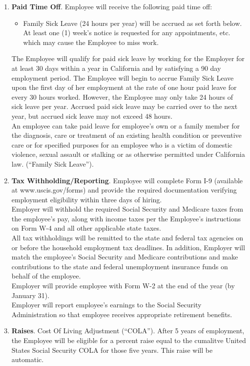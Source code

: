\documentclass[]{article}
\begin{document}
\begin{enumerate}
\begin{enumerate}
	\item{\textbf{Paid Time Off}}. Employee will receive the following paid time off:
		\begin{itemize}
			\item Family Sick Leave (24 hours per year) will be accrued as set forth below. At least one (1) week's notice is requested for any appointments, etc. which may cause the Employee to miss work.
		\end{itemize}
		The Employee will qualify for paid sick leave by working for the Employer for at least 30 days within a year in California and by satisfying a 90 day employment period. The Employee will begin to accrue Family Sick Leave upon the first day of her employment at the rate of one hour paid leave for every 30 hours worked. However, the Employee may only take 24 hours of sick leave per year. Accrued paid sick leave may be carried over to the next year, but accrued sick leave may not exceed 48 hours.\\
	An employee can take paid leave for employee's own or a family member for the diagnosis, care or treatment of an existing health condition or preventive care or for specified purposes for an employee who is a victim of domestic violence, sexual assault or stalking or as otherwise permitted under California law. (``Family Sick Leave'').
	\item{\textbf{Tax Withholding/Reporting}}. Employee will complete Form I-9 (available at www.uscis.gov/forms) and provide the required documentation verifying employment eligibility within three days of hiring.\\
	Employer will withhold the required Social Security and Medicare taxes from the employee's pay, along with income taxes per the Employee's instructions on Form W-4 and all other applicable state taxes.\\
	All tax withholdings will be remitted to the state and federal tax agencies on or before the household employment tax deadlines. In addition, Employer will match the employee's Social Security and Medicare contributions and make contributions to the state and federal unemployment insurance funds on behalf of the employee.\\
	Employer will provide employee with Form W-2 at the end of the year (by January 31).\\
	Employer will report employee's earnings to the Social Security Administration so that employee receives appropriate retirement benefits.
	\item{\textbf{Raises}}. Cost Of Living Adjustment (``COLA''). After 5 years of employment, the Employee will be eligible for a percent raise equal to the cumalitve United States Social Security COLA for those five years. This raise will be automatic.
\end{enumerate}


\end{enumerate}
\end{document}
